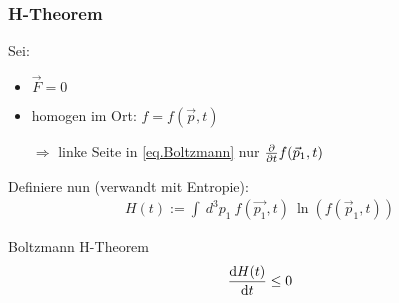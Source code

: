 \subsubsection*{H-Theorem}
Sei:
\begin{itemize}
    \item $\Vec{F}=0$
    \item homogen im Ort: $f=f(\Vec{p},t)$
    \item[$\Rightarrow$] linke Seite in \cref{eq.Boltzmann} nur $\pdv{}{t} f(\Vec{p}_1,t)$
\end{itemize}
Definiere nun (verwandt mit Entropie):
\begin{align}
    H(t) := \int \ d^3p_1 \ f(\Vec{p_1},t) \ \ln(f(\Vec{p}_1,t))
\end{align}

\begin{definition}{Boltzmann H-Theorem}
    \begin{equation}
        \dv{H(t)}{t} \leq 0
    \end{equation}
\end{definition}

